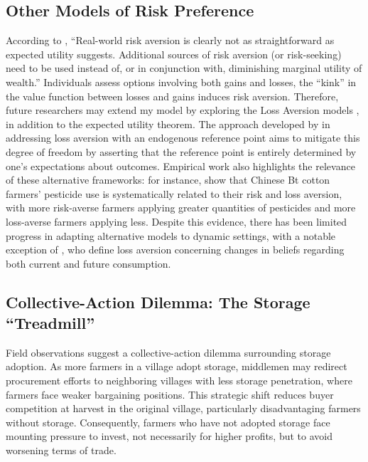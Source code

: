 \subsection{Other Models of Risk Preference}
\noindent According to \cite{o2018modeling}, ``Real-world risk aversion is clearly not as straightforward as expected utility suggests. Additional sources of risk aversion (or risk-seeking) need to be used instead of, or in conjunction with, diminishing marginal utility of wealth.'' Individuals assess options involving both gains and losses, the ``kink'' in the value function between losses and gains induces risk aversion. Therefore, future researchers may extend my model by exploring the Loss Aversion models \citep{kahneman1979prospect}, in addition to the expected utility theorem. The approach developed by \cite{kHoszegi2006model, kHoszegi2007reference, kHoszegi2009reference} in addressing loss aversion with an endogenous reference point aims to mitigate this degree of freedom by asserting that the reference point is entirely determined by one's expectations about outcomes. Empirical work also highlights the relevance of these alternative frameworks: for instance, \cite{liu2013risk} show that Chinese Bt cotton farmers’ pesticide use is systematically related to their risk and loss aversion, with more risk-averse farmers applying greater quantities of pesticides and more loss-averse farmers applying less. Despite this evidence, there has been limited progress in adapting alternative models to dynamic settings, with a notable exception of \cite{kHoszegi2009reference}, who define loss aversion concerning changes in beliefs regarding both current and future consumption.



\subsection{Collective-Action Dilemma: The Storage ``Treadmill''}
\noindent Field observations suggest a collective-action dilemma surrounding storage adoption. As more farmers in a village adopt storage, middlemen may redirect procurement efforts to neighboring villages with less storage penetration, where farmers face weaker bargaining positions. This strategic shift reduces buyer competition at harvest in the original village, particularly disadvantaging farmers without storage. Consequently, farmers who have not adopted storage face mounting pressure to invest, not necessarily for higher profits, but to avoid worsening terms of trade. 

